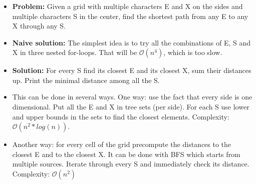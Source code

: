 \begin{frame}
    \frametitle{\problemtitle}
    \begin{itemize}
        \item<+-> \textbf{Problem:} Given a grid with multiple characters E and X on the sides and multiple characters S in the center, find the shortest path from any E to any X through any S.
        \item<+-> \textbf{Naive solution:} The simplest idea is to try all the combinations of E, S and X in three nested for-loops. That will be $\mathcal O(n^4)$, which is too slow.
        \item<+-> \textbf{Solution:} For every S find its closest E and its closest X, sum their distances up. Print the minimal distance among all the S.
        \item<+-> This can be done in several ways. One way: use the fact that every side is one dimensional. Put all the E and X in tree sets (per side). For each S use lower and upper bounds in the sets to find the closest elements. Complexity: $\mathcal O(n^2*log(n))$.
        \item<+-> Another way: for every cell of the grid precompute the distances to the closest E and to the closest X. It can be done with BFS which starts from multiple sources. Iterate through every S and immediately check its distance. Complexity: $\mathcal O(n^2)$
    \end{itemize}
\end{frame}
